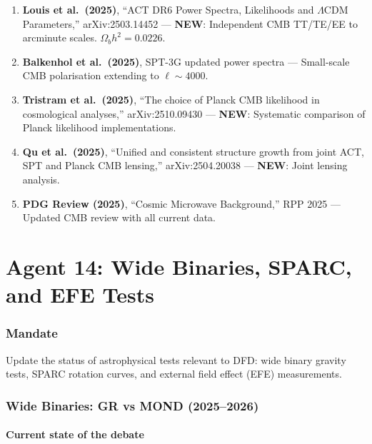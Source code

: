 \documentclass[11pt,a4paper]{article}
\newcommand{\NEW}{\textcolor{dfdblue}{\textbf{NEW}}}
\begin{document}
\begin{enumerate}
\item \textbf{Louis et al.\ (2025)}, ``ACT DR6 Power Spectra, Likelihoods and $\Lambda$CDM Parameters,'' arXiv:2503.14452 --- \NEW: Independent CMB TT/TE/EE to arcminute scales. $\Omega_b h^2 = 0.0226$.

\item \textbf{Balkenhol et al.\ (2025)}, SPT-3G updated power spectra --- Small-scale CMB polarisation extending to $\ell \sim 4000$.

\item \textbf{Tristram et al.\ (2025)}, ``The choice of Planck CMB likelihood in cosmological analyses,'' arXiv:2510.09430 --- \NEW: Systematic comparison of Planck likelihood implementations.

\item \textbf{Qu et al.\ (2025)}, ``Unified and consistent structure growth from joint ACT, SPT and Planck CMB lensing,'' arXiv:2504.20038 --- \NEW: Joint lensing analysis.

\item \textbf{PDG Review (2025)}, ``Cosmic Microwave Background,'' RPP 2025 --- Updated CMB review with all current data.
\end{enumerate}


\part{Agent 14: Wide Binaries, SPARC, and EFE Tests}
\label{part:agent14}

\section{Mandate}

Update the status of astrophysical tests relevant to DFD: wide binary gravity tests, SPARC rotation curves, and external field effect (EFE) measurements.

\section{Wide Binaries: GR vs MOND (2025--2026)}

\subsection{Current state of the debate}
\end{document}
